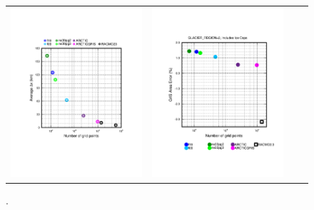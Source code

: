\documentclass[draft]{agujournal2019}
\begin{document}
\begin{figure}[t]
\begin{center}
\begin{tabular}{cccc}
         \includegraphics[width=60mm]{figs/temp_grisres_dxoverglc.pdf}&
         \includegraphics[width=60mm]{figs/temp_grisres_error.pdf} \\
\end{tabular}
\end{center}
\caption{.}
\label{fig:grisdx}
\end{figure}
\end{document}
